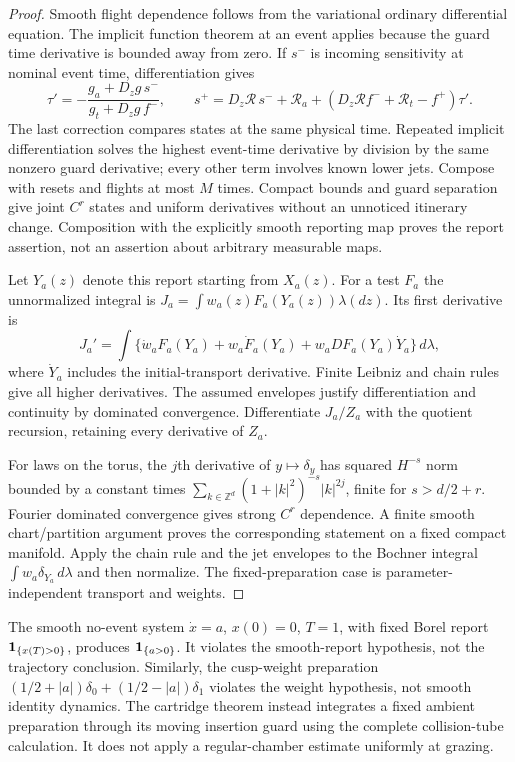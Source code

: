 \begin{proof}
Smooth flight dependence follows from the variational ordinary differential equation. The implicit function theorem at an event applies because the guard time derivative is bounded away from zero. If $s^-$ is incoming sensitivity at nominal event time, differentiation gives
\[
 \tau'=-\frac{g_a+D_zg\,s^-}{g_t+D_zg\,f^-},\qquad
 s^+=D_z\mathcal R\,s^-+\mathcal R_a+
 (D_z\mathcal R f^-+\mathcal R_t-f^+)\tau'.
\]
The last correction compares states at the same physical time. Repeated implicit differentiation solves the highest event-time derivative by division by the same nonzero guard derivative; every other term involves known lower jets. Compose with resets and flights at most $M$ times. Compact bounds and guard separation give joint $C^r$ states and uniform derivatives without an unnoticed itinerary change. Composition with the explicitly smooth reporting map proves the report assertion, not an assertion about arbitrary measurable maps.

Let $Y_a(z)$ denote this report starting from $X_a(z)$. For a test $F_a$ the unnormalized integral is $J_a=\int w_a(z)F_a(Y_a(z))\lambda(dz)$. Its first derivative is
\[
 J_a'=\int\{\dot w_aF_a(Y_a)+w_a\dot F_a(Y_a)
                       +w_a DF_a(Y_a)\dot Y_a\}\,d\lambda,
\]
where $\dot Y_a$ includes the initial-transport derivative. Finite Leibniz and chain rules give all higher derivatives. The assumed envelopes justify differentiation and continuity by dominated convergence. Differentiate $J_a/Z_a$ with the quotient recursion, retaining every derivative of $Z_a$.

For laws on the torus, the $j$th derivative of $y\mapsto\delta_y$ has squared $H^{-s}$ norm bounded by a constant times
$\sum_{k\in\mathbb Z^d}(1+|k|^2)^{-s}|k|^{2j}$, finite for $s>d/2+r$. Fourier dominated convergence gives strong $C^r$ dependence. A finite smooth chart/partition argument proves the corresponding statement on a fixed compact manifold. Apply the chain rule and the jet envelopes to the Bochner integral $\int w_a\delta_{Y_a}\,d\lambda$ and then normalize. The fixed-preparation case is parameter-independent transport and weights.
\end{proof}

The smooth no-event system $\dot x=a$, $x(0)=0$, $T=1$, with fixed Borel report $\mathbf1_{\{x(T)>0\}}$, produces $\mathbf1_{\{a>0\}}$. It violates the smooth-report hypothesis, not the trajectory conclusion. Similarly, the cusp-weight preparation $(1/2+|a|)\delta_0+(1/2-|a|)\delta_1$ violates the weight hypothesis, not smooth identity dynamics. The cartridge theorem instead integrates a fixed ambient preparation through its moving insertion guard using the complete collision-tube calculation. It does not apply a regular-chamber estimate uniformly at grazing.
